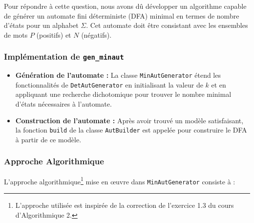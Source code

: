 Pour répondre à cette question, nous avons dû développer un algorithme capable de générer un automate fini déterministe (DFA) minimal en termes de nombre d'états pour un alphabet \( \Sigma \). Cet automate doit être consistant avec les ensembles de mots \( P \) (positifs) et \( N \) (négatifs).

\subsubsection*{Implémentation de \texttt{gen\_minaut}}

\begin{itemize}
    \item \textbf{Génération de l'automate :} La classe \texttt{MinAutGenerator} étend les fonctionnalités de \texttt{DetAutGenerator} en initialisant la valeur de $k$ et en appliquant une recherche dichotomique pour trouver le nombre minimal d'états nécessaires à l'automate.\\

    \item \textbf{Construction de l'automate :} Après avoir trouvé un modèle satisfaisant, la fonction \texttt{build} de la classe \texttt{AutBuilder} est appelée pour construire le DFA à partir de ce modèle.
    
\end{itemize}

\subsubsection*{Approche Algorithmique}
L'approche algorithmique\footnote{L'approche utilisée est inspirée de la correction de l'exercice 1.3 du cours d'Algorithmique 2.} mise en œuvre dans \texttt{MinAutGenerator} consiste à :

